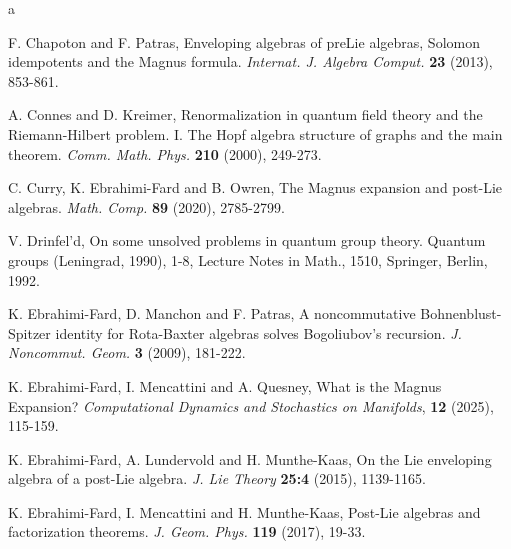 \documentclass[12pt]{amsart}
\theoremstyle{definition}   %
\begin{document}
\begin{thebibliography}{a}

 F. Chapoton and F. Patras,   Enveloping algebras of preLie algebras, Solomon idempotents and the Magnus formula. \emph{Internat. J. Algebra Comput.} {\bf 23} (2013),  853-861.



A. Connes and D. Kreimer, Renormalization in quantum field theory and the Riemann-Hilbert problem. I. The Hopf algebra structure of graphs and the main theorem. {\em Comm. Math. Phys.} {\bf 210} (2000), 249-273.

C. Curry, K. Ebrahimi-Fard and B.  Owren,  The Magnus expansion and post-Lie algebras. \emph{Math. Comp.} \textbf{89} (2020),  2785-2799.



 V.  Drinfel'd, On some unsolved problems in quantum group theory. Quantum groups (Leningrad, 1990), 1-8, Lecture Notes in Math., 1510, Springer, Berlin, 1992.

K. Ebrahimi-Fard, D. Manchon and F. Patras, A noncommutative Bohnenblust-Spitzer identity for Rota-Baxter algebras solves Bogoliubov's recursion.  {\em J. Noncommut. Geom.} {\bf 3} (2009), 181-222.

K. Ebrahimi-Fard, I. Mencattini and A. Quesney, What is the Magnus Expansion?  {\em Computational Dynamics and Stochastics on Manifolds}, {\bf12} (2025), 115-159.

 K. Ebrahimi-Fard, A. Lundervold and H.  Munthe-Kaas, On the Lie enveloping algebra of a post-Lie algebra. \textit{J. Lie Theory} {\bf 25:4} (2015), 1139-1165.

K. Ebrahimi-Fard, I. Mencattini and H. Munthe-Kaas, Post-Lie algebras and factorization theorems. {\em J. Geom. Phys.} {\bf 119} (2017), 19-33.


\end{thebibliography}
\end{document}
